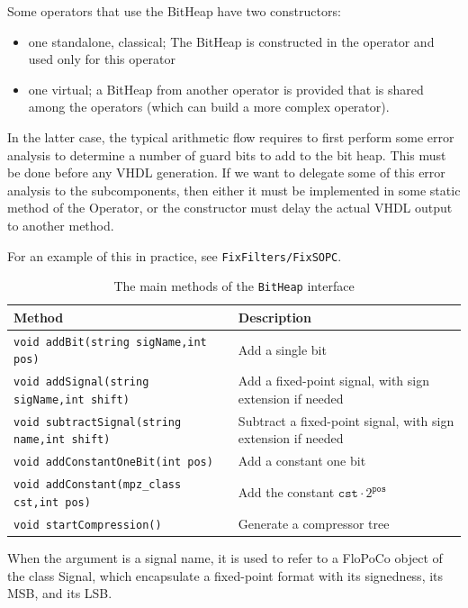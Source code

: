 \documentclass{article}
\begin{document}
Some operators that use the BitHeap have two constructors:
\begin{itemize}
	\item one standalone, classical; The BitHeap is constructed in the operator and used only for this operator
	\item one virtual; a BitHeap from another operator is provided that is shared among the operators (which can build a more complex operator).
\end{itemize}

In the latter case, the typical arithmetic flow requires to first perform some error analysis to determine a number of guard bits to add to the bit heap.
This must be done before any VHDL generation.
If we want to delegate some of this error analysis to the subcomponents, then either it must be implemented in some static method of the Operator, or the constructor must delay the actual VHDL output to another method.

For an example of this in practice, see \texttt{FixFilters/FixSOPC}.

\begin{table}[t]
  \centering
    \begin{center}
      \caption{The main methods of the \texttt{BitHeap} interface}
	\label{tab:bit_heap_interface}
  \footnotesize
  
    \begin{tabular}{L{0.5\textwidth}L{0.4\textwidth}}
    	\toprule
		Method                                        & Description                                      \\
    	\midrule
      {\texttt{void addBit(string sigName,int pos)}}      & Add a single bit                                 \\
      {\texttt{void addSignal(string sigName,int shift)}}   & Add a fixed-point signal, with sign extension if needed                       \\
      {\texttt{void subtractSignal(string name,int shift)}} & Subtract a fixed-point signal, with sign extension if needed                  \\
      {\texttt{void addConstantOneBit(int pos)}}  & Add a constant one bit                           \\[1ex]
      {\texttt{void addConstant(mpz\_class cst,int pos)}} & Add the constant $\mathtt{cst}\cdot 2^{\mathtt{pos}}$ \\
      {\texttt{void startCompression()}}          & Generate a compressor tree                       \\
    	\bottomrule
    \end{tabular}
        When the argument is a signal name, it is used to refer to a FloPoCo object of the class Signal, which encapsulate a fixed-point format with its  signedness, its MSB, and its LSB.
    \end{center}
\end{table}
\end{document}

